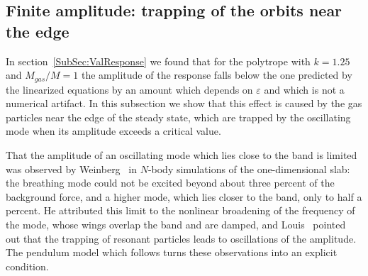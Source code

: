 \subsection{Finite amplitude: trapping of the orbits near the edge}
\label{SubSec:FixedLTrapping}

In section~\ref{SubSec:ValResponse} we found that for the polytrope with $k = 1.25$ and $M_{gas}/M = 1$ the amplitude of the response falls below the one predicted by the linearized equations by an amount which depends on $\varepsilon$ and which is not a numerical artifact. In this subsection we show that this effect is caused by the gas particles near the edge of the steady state, which are trapped by the oscillating mode when its amplitude exceeds a critical value.

That the amplitude of an oscillating mode which lies close to the band is limited was observed by Weinberg~\cite{mW91} in $N$-body simulations of the one-dimensional slab: the breathing mode could not be excited beyond about three percent of the background force, and a higher mode, which lies closer to the band, only to half a percent. He attributed this limit to the nonlinear broadening of the frequency of the mode, whose wings overlap the band and are damped, and Louis~\cite{pL92} pointed out that the trapping of resonant particles leads to oscillations of the amplitude. The pendulum model which follows turns these observations into an explicit condition.

